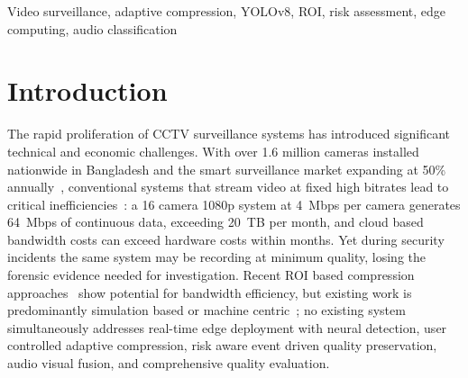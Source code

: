 \documentclass[conference]{IEEEtran}
\begin{document}
\begin{abstract}
High resolution surveillance cameras generate enormous bandwidth demands, yet conventional compression treats every frame uniformly, wasting data on empty scenes while potentially losing crucial details during security events. This paper presents a risk aware adaptive compression system that dynamically allocates bandwidth according to the surveillance significance of each scene region. A three-tier architecture is proposed: edge nodes running YOLOv8 object detection identify regions of interest (ROIs) such as people and vehicles, a central server manages camera registries and state transitions, and a web dashboard provides real-time monitoring and control. The key innovation is spatially variable compression: ROIs are transmitted at full resolution and high quality while backgrounds are aggressively downscaled. An audio pipeline integrates energy-threshold detection and YAMNet deep learning for 11-class sound classification, contributing to a multimodal risk assessment engine. Experimental results demonstrate 80--95\% bandwidth reduction compared to conventional uniform compression with no degradation in forensic utility during critical events. The system automatically escalates to full-quality recording when threats are detected, ensuring that critical moments are captured with maximum fidelity.
\end{abstract}

\begin{IEEEkeywords}
Video surveillance, adaptive compression, YOLOv8, ROI, risk assessment, edge computing, audio classification
\end{IEEEkeywords}

\section{Introduction}
The rapid proliferation of CCTV surveillance systems has introduced significant technical and economic challenges. With over 1.6 million cameras installed nationwide in Bangladesh and the smart surveillance market expanding at 50\% annually~\cite{islam2024sdn}, conventional systems that stream video at fixed high bitrates lead to critical inefficiencies~\cite{ahmad2024bandwidth}: a 16 camera 1080p system at 4~Mbps per camera generates 64~Mbps of continuous data, exceeding 20~TB per month, and cloud based bandwidth costs can exceed hardware costs within months. Yet during security incidents the same system may be recording at minimum quality, losing the forensic evidence needed for investigation. Recent ROI based compression approaches~\cite{wang2025compression,li2024region} show potential for bandwidth efficiency, but existing work is predominantly simulation based or machine centric~\cite{guo2023deepstream,labiod2023region}; no existing system simultaneously addresses real-time edge deployment with neural detection, user controlled adaptive compression, risk aware event driven quality preservation, audio visual fusion, and comprehensive quality evaluation.
\end{document}
